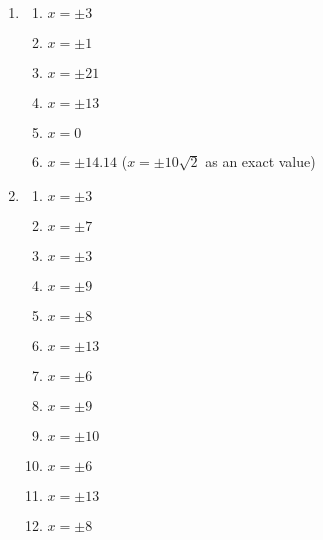 \documentclass[a4paper,12pt]{article}
\begin{document}
\begin{enumerate}
\item 
    \begin{multicols}{2}
    \begin{enumerate}
    \item $x = \pm 3$
    \item $x = \pm 1$
    \item $x = \pm 21$
    \item $x = \pm 13$
    \item $x = 0$
    \item $x = \pm 14.14$ ($x = \pm 10 \sqrt{2}$ as an exact value)
    \end{enumerate}
    \end{multicols}
\item
    \begin{multicols}{2}
    \begin{enumerate}
    \item $x = \pm 3$
    \item $x = \pm 7$
    \item $x = \pm 3$
    \item $x = \pm 9$
    \item $x = \pm 8$
    \item $x = \pm 13$
    \item $x = \pm 6$
    \item $x = \pm 9$
    \item $x = \pm 10$
    \item $x = \pm 6$
    \item $x = \pm 13$
    \item $x = \pm 8$
    \end{enumerate}
    \end{multicols}
\end{enumerate}
\end{document}
